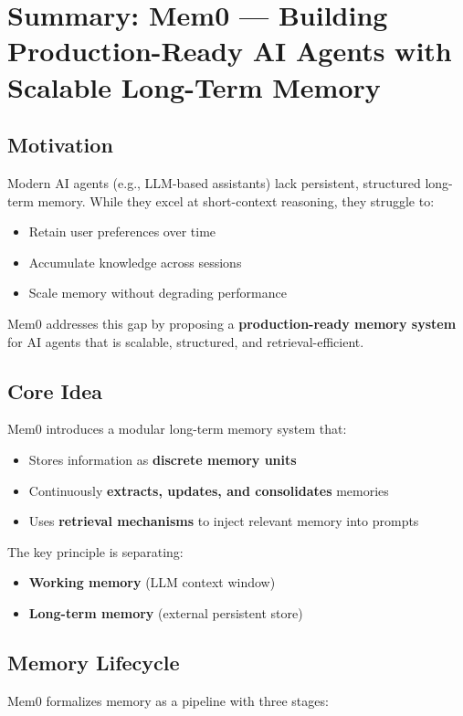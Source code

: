 \documentclass[12pt]{article}
\begin{document}
\psetheader %
\section{Summary: Mem0 --- Building Production-Ready AI Agents with Scalable Long-Term Memory}

\subsection{Motivation}
Modern AI agents (e.g., LLM-based assistants) lack persistent, structured long-term memory. While they excel
at short-context reasoning, they struggle to:
\begin{itemize}
		\item Retain user preferences over time
		\item Accumulate knowledge across sessions
		\item Scale memory without degrading performance
\end{itemize}
Mem0 addresses this gap by proposing a \textbf{production-ready memory system} for AI agents that is
scalable, structured, and retrieval-efficient.

\subsection{Core Idea}
Mem0 introduces a modular long-term memory system that:
\begin{itemize}
		\item Stores information as \textbf{discrete memory units}
		\item Continuously \textbf{extracts, updates, and consolidates} memories
		\item Uses \textbf{retrieval mechanisms} to inject relevant memory into prompts
\end{itemize}

The key principle is separating:
\begin{itemize}
		\item \textbf{Working memory} (LLM context window)
		\item \textbf{Long-term memory} (external persistent store)
\end{itemize}

\subsection{Memory Lifecycle}
Mem0 formalizes memory as a pipeline with three stages:
\end{document}
